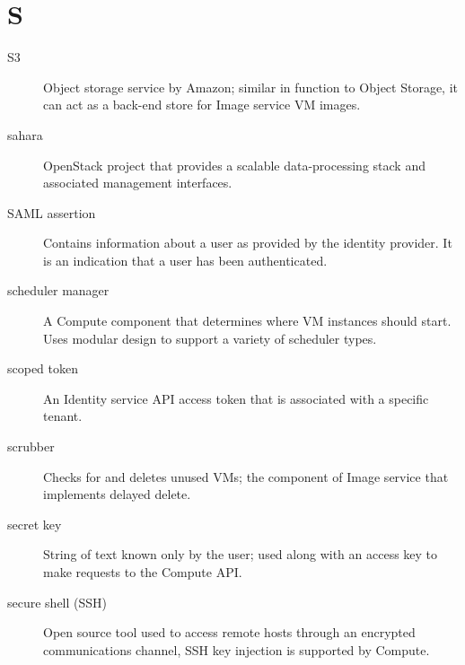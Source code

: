 \documentclass[letterpaper,10pt,english]{sphinxmanual}
\begin{document}
\section{S}
\label{_source/glossary:s}\begin{description}
\item[{S3}] \leavevmode{}\label{_source/glossary:term-s3}
Object storage service by Amazon; similar in function to Object
Storage, it can act as a back-end store for Image service VM images.

\item[{sahara}] \leavevmode{}\label{_source/glossary:term-sahara}
OpenStack project that provides a scalable data-processing stack
and associated management interfaces.

\item[{SAML assertion}] \leavevmode{}\label{_source/glossary:term-saml-assertion}
Contains information about a user as provided by the identity
provider. It is an indication that a user has been authenticated.

\item[{scheduler manager}] \leavevmode{}\label{_source/glossary:term-scheduler-manager}
A Compute component that determines where VM instances should
start. Uses modular design to support a variety of scheduler
types.

\item[{scoped token}] \leavevmode{}\label{_source/glossary:term-scoped-token}
An Identity service API access token that is associated with a
specific tenant.

\item[{scrubber}] \leavevmode{}\label{_source/glossary:term-scrubber}
Checks for and deletes unused VMs; the component of Image
service that implements delayed delete.

\item[{secret key}] \leavevmode{}\label{_source/glossary:term-secret-key}
String of text known only by the user; used along with an access
key to make requests to the Compute API.

\item[{secure shell (SSH)}] \leavevmode{}\label{_source/glossary:term-secure-shell-ssh}
Open source tool used to access remote hosts through an
encrypted communications channel, SSH key injection is supported by
Compute.


\end{description}
\end{document}
